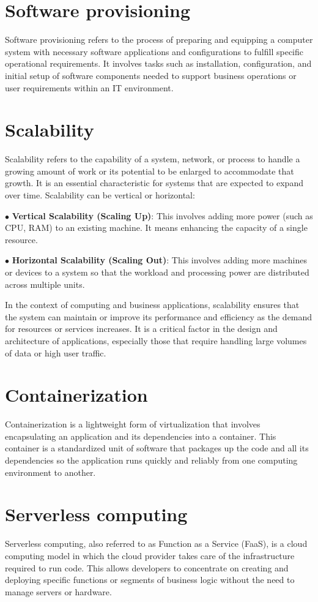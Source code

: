 \section{Software provisioning}
Software provisioning refers to the process of preparing and equipping a computer system with necessary software applications and configurations to fulfill specific operational requirements. It involves tasks such as installation, configuration, and initial setup of software components needed to support business operations or user requirements within an IT environment.


\section{Scalability}
Scalability refers to the capability of a system, network,
or process to handle a growing amount of work or its potential to be enlarged
to accommodate that growth. It is an essential characteristic for systems that are expected to expand over time.
Scalability can be vertical or horizontal:

$\bullet$ \textbf{Vertical Scalability (Scaling Up)}: This involves adding more power (such as CPU, RAM) to an existing machine. It means enhancing the capacity of a single resource.

$\bullet$ \textbf{Horizontal Scalability (Scaling Out)}: This involves adding more machines or devices to a system so that the workload and processing power are distributed across multiple units.

In the context of computing and business applications, scalability ensures that the system can maintain or improve its performance and efficiency as the demand for resources or services increases. It is a critical factor in the design and architecture of applications, especially those that require handling large volumes of data or high user traffic.

\section{ Containerization}
Containerization is a lightweight form of virtualization that involves
encapsulating an application and its dependencies into a container. 
This container is a standardized unit of software that packages up the code and all its dependencies so the application runs quickly and reliably from one computing environment to another.

\section{Serverless computing}
Serverless computing, also referred to as Function as a Service (FaaS), is a cloud computing model in which the cloud provider takes care of the infrastructure required to run code. This allows developers to concentrate on creating and deploying specific functions or segments of business logic without the need to manage servers or hardware.


